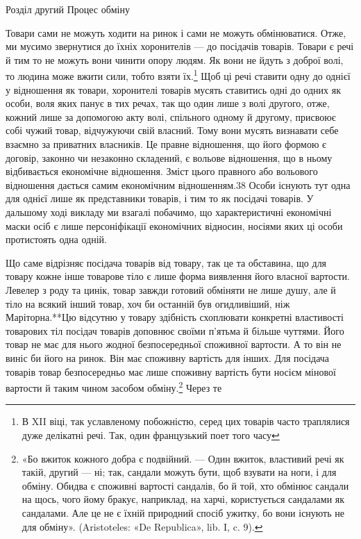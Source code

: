 Розділ другий
Процес обміну

Товари сами не можуть ходити на ринок і сами не можуть
обмінюватися. Отже, ми мусимо звернутися до їхніх хоронителів —
до посідачів товарів. Товари є речі й тим то не можуть вони чинити
опору людям. Як вони не йдуть з доброї волі, то людина може
вжити сили, тобто взяти їх.\footnote{
В XII віці, так уславленому побожністю, серед цих товарів часто
траплялися дуже делікатні речі. Так, один французький поет того часу
} Щоб ці речі ставити одну до однієї
у відношення як товари, хоронителі товарів мусять ставитись
одні до одних як особи, воля яких панує в тих речах, так що один
лише з волі другого, отже, кожний лише за допомогою акту волі,
спільного одному й другому, присвоює собі чужий товар, відчужуючи
свій власний. Тому вони мусять визнавати себе взаємно
за приватних власників. Це правне відношення, що його формою
є договір, законно чи незаконно складений, є вольове відношення,
що в ньому відбивається економічне відношення. Зміст цього
правного або вольового відношення дається самим економічним
відношенням.38 Особи існують тут одна для однієї лише як представники
товарів, і тим то як посідачі товарів. У дальшому ході
викладу ми взагалі побачимо, що характеристичні економічні
маски осіб є лише персоніфікації економічних відносин, носіями
яких ці особи протистоять одна одній.

Що саме відрізняє посідача товарів від товару, так це та обставина,
що для товару кожне інше товарове тіло є лише форма виявлення
його власної вартости. Левелер з роду та цинік, товар
завжди готовий обміняти не лише душу, але й тіло на всякий
інший товар, хоч би останній був огидливіший, ніж Маріторна.**Цю
відсутню у товару здібність схоплювати конкретні
властивості товарових тіл посідач товарів доповнює своїми п’ятьма
й більше чуттями. Його товар не має для нього жодної безпосередньої
споживної вартости. А то він не виніс би його на ринок.
Він має споживну вартість для інших. Для посідача товарів
товар безпосередньо має лише споживну вартість бути носієм
мінової вартости й таким чином засобом обміну.\footnote{
«Бо вжиток кожного добра є подвійний. — Один вжиток, властивий
речі як такій, другий — ні; так, сандали можуть бути, щоб взувати
на ноги, і для обміну. Обидва є споживні вартості сандалів, бо й той, хто
обмінює сандали на щось, чого йому бракує, наприклад, на харчі, користується
сандалами як сандалами. Але це не є їхній природний спосіб
ужитку, бо вони існують не для обміну». (Aristoteles: «De Republica»,
lib. I, c. 9).
} Через те

